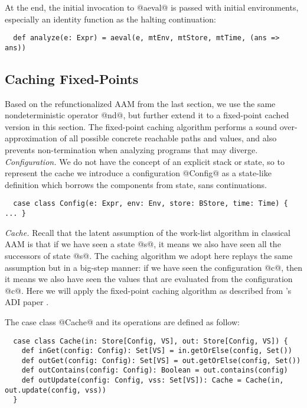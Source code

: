 \documentclass[acmsmall, review]{acmart}\settopmatter{}
\begin{document}
At the end, the initial invocation to @aeval@ is passed with initial environments,
especially an identity function as the halting continuation:
\begin{lstlisting}
  def analyze(e: Expr) = aeval(e, mtEnv, mtStore, mtTime, (ans => ans))
\end{lstlisting}

\subsection{Caching Fixed-Points}

Based on the refunctionalized AAM from the last section, we use the same nondeterministic
operator @nd@, but further extend it to a fixed-point cached version in this section.
The fixed-point caching algorithm performs a sound over-approximation of all possible
concrete reachable paths and values, and also prevents non-termination when analyzing 
programs that may diverge. \\

\textit{Configuration.}
We do not have the concept of an explicit stack or state, so to represent the cache 
we introduce a configuration @Config@ as a state-like definition which borrows the 
components from state, sans continuations.

\begin{lstlisting}
  case class Config(e: Expr, env: Env, store: BStore, time: Time) { ... }
\end{lstlisting}

\textit{Cache.}
Recall that the latent assumption of the work-list algorithm in classical AAM is that 
if we have seen a state @s@, it means we also have seen all the successors of state @s@.
The caching algorithm we adopt here replays the same assumption but in a big-step 
manner: if we have seen the configuration @c@, then it means we also have seen the 
values that are evaluated from the configuration @c@.
Here we will apply the fixed-point caching algorithm as described from
\citeauthor{darais2017abstracting}'s ADI paper \cite{darais2017abstracting}.

The case class @Cache@ and its operations are defined as follow:

\begin{lstlisting}
  case class Cache(in: Store[Config, VS], out: Store[Config, VS]) {
    def inGet(config: Config): Set[VS] = in.getOrElse(config, Set())
    def outGet(config: Config): Set[VS] = out.getOrElse(config, Set())
    def outContains(config: Config): Boolean = out.contains(config)
    def outUpdate(config: Config, vss: Set[VS]): Cache = Cache(in, out.update(config, vss))
  }
\end{lstlisting}
\end{document}
